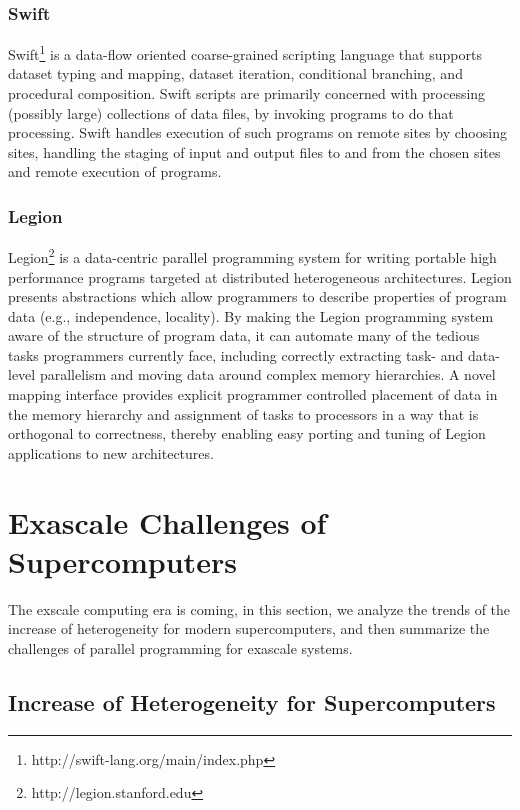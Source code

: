 \subsubsection{Swift}

Swift\footnote{http://swift-lang.org/main/index.php} \cite{wilde2011swift} is a data-flow oriented coarse-grained scripting language that supports dataset typing and mapping, dataset iteration, conditional branching, and procedural composition. Swift scripts are primarily concerned with processing (possibly large) collections of data files, by invoking programs to do that processing. Swift handles execution of such programs on remote sites by choosing sites, handling the staging of input and output files to and from the chosen sites and remote execution of programs.

\subsubsection{Legion}

Legion\footnote{http://legion.stanford.edu} \cite{grimshaw1994synopsis} is a data-centric parallel programming system for writing portable high performance programs targeted at distributed heterogeneous architectures. Legion presents abstractions which allow programmers to describe properties of program data (e.g., independence, locality). By making the Legion programming system aware of the structure of program data, it can automate many of the tedious tasks programmers currently face, including correctly extracting task- and data-level parallelism and moving data around complex memory hierarchies. A novel mapping interface provides explicit programmer controlled placement of data in the memory hierarchy and assignment of tasks to processors in a way that is orthogonal to correctness, thereby enabling easy porting and tuning of Legion applications to new architectures.

\section{Exascale Challenges of Supercomputers}\label{Exascale Challenges of Supercomputers}

The exscale computing era is coming, in this section, we analyze the trends of the increase of heterogeneity for modern supercomputers, and then summarize the challenges of parallel programming for exascale systems.

\subsection{Increase of Heterogeneity for Supercomputers} \label{Trends of Heterogeneity}

